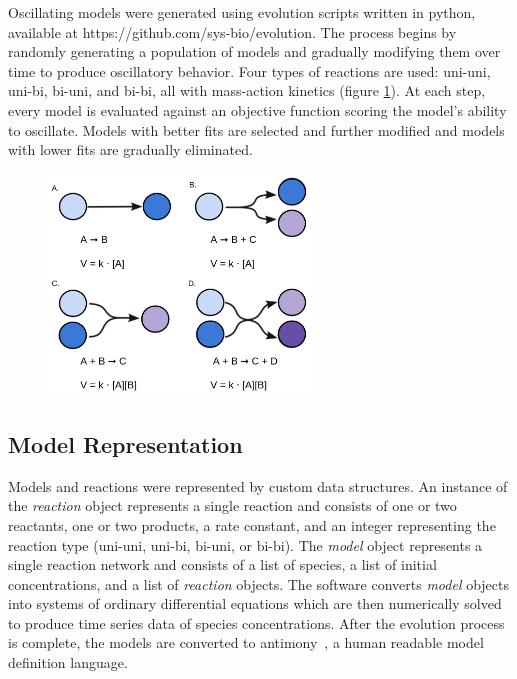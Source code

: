 \documentclass[12pt]{report}
\begin{document}
Oscillating models were generated using evolution scripts written in python, available at https://github.com/sys-bio/evolution. The process begins by randomly generating a population of models and gradually modifying them over time to produce oscillatory behavior. Four types of reactions are used: uni-uni, uni-bi, bi-uni, and bi-bi, all with mass-action kinetics (figure \ref{fig:reaction}). At each step, every model is evaluated against an objective function scoring the model's ability to oscillate. Models with better fits are selected and further modified and models with lower fits are gradually eliminated. 
\begin{figure}
    \centering
    \includegraphics[width=7cm]{images/Reactions.png}
    \label{fig:reaction}
    
\end{figure}





\subsection{Model Representation}

Models and reactions were represented by custom data structures. An instance of the \textit{reaction} object represents a single reaction and consists of one or two reactants, one or two products, a rate constant, and an integer representing the reaction type (uni-uni, uni-bi, bi-uni, or bi-bi). The \textit{model} object represents a single reaction network and consists of a list of species, a list of initial concentrations, and a list of \textit{reaction} objects. The software converts \textit{model} objects into systems of ordinary differential equations which are then numerically solved to produce time series data of species concentrations. After the evolution process is complete, the models are converted to antimony~\cite{Smith2009}, a human readable model definition language.
\end{document}
